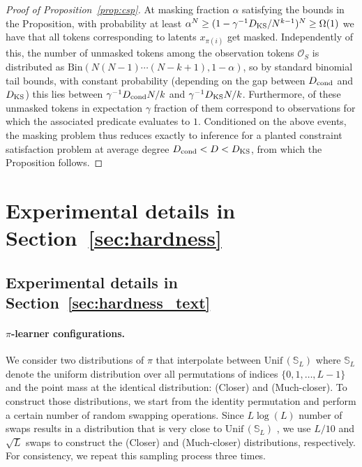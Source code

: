 \begin{proof}[Proof of Proposition~\ref{prop:csp}]
    At masking fraction $\alpha$ satisfying the bounds in the Proposition, with probability at least $\alpha^N \ge (1 - \gamma^{-1}D_{\rm KS}/N^{k-1})^N \ge \Omega(1)$ we have that all tokens corresponding to latents $x_{\pi(i)}$ get masked. Independently of this, the number of unmasked tokens among the observation tokens $\mathcal{O}_S$ is distributed as $\mathrm{Bin}(N(N-1)\cdots (N-k+1), 1 - \alpha)$, so by standard binomial tail bounds, with constant probability (depending on the gap between $D_{\rm cond}$ and $D_{\rm KS}$) this lies between $\gamma^{-1} D_{\rm cond}N/k$ and $\gamma^{-1} D_{\rm KS}N/k$. Furthermore, of these unmasked tokens in expectation $\gamma$ fraction of them correspond to observations for which the associated predicate evaluates to $1$. Conditioned on the above events, the masking problem thus reduces exactly to inference for a planted constraint satisfaction problem at average degree $D_{\rm cond} < D < D_{\rm KS}$, from which the Proposition follows.
\end{proof}

\section{Experimental details in Section~\ref{sec:hardness}}

\subsection{Experimental details in Section~\ref{sec:hardness_text}} \label{appendix:exp_detail_text}

\paragraph{$\pi$-learner configurations.} We consider two distributions of $\pi$ that interpolate between $\mathrm{Unif\,}(\mathbb{S}_L)$ where $\mathbb{S}_L$ denote the uniform distribution over all permutations of indices $\{0,1, \ldots, L-1\}$ and the point mass at the identical distribution: (Closer) and (Much-closer). To construct those distributions, we start from the identity permutation and perform a certain number of random swapping operations. Since $L\log(L)$ number of swaps results in a distribution that is very close to $\mathrm{Unif\,}(\mathbb{S}_L)$ \cite{bormashenko2011coupling}, we use $L/10$ and $\sqrt{L}$ swaps to construct the (Closer) and (Much-closer) distributions, respectively. For consistency, we repeat this sampling process three times.

